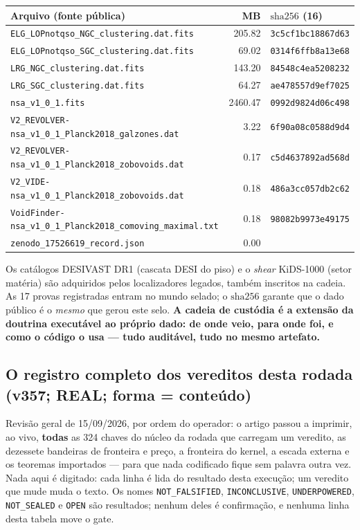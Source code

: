 \documentclass[11pt]{article}
\theoremstyle{definition}\newtheorem{deriv}{Derivação}
\begin{document}
\begin{center}\footnotesize\begin{longtable}{@{}p{}rl@{}}\toprule Arquivo (fonte pública) & MB & $\mathrm{sha}256$ (16) \\ \midrule\endhead \texttt{ELG\_LOPnotqso\_NGC\_clustering.dat.fits} & 205.82 & \texttt{3c5cf1bc18867d63} \\  \texttt{ELG\_LOPnotqso\_SGC\_clustering.dat.fits} & 69.02 & \texttt{0314f6ffb8a13e68} \\  \texttt{LRG\_NGC\_clustering.dat.fits} & 143.20 & \texttt{84548c4ea5208232} \\  \texttt{LRG\_SGC\_clustering.dat.fits} & 64.27 & \texttt{ae478557d9ef7025} \\  \texttt{nsa\_v1\_0\_1.fits} & 2460.47 & \texttt{0992d9824d06c498} \\  \texttt{V2\_REVOLVER-nsa\_v1\_0\_1\_Planck2018\_galzones.dat} & 3.22 & \texttt{6f90a08c0588d9d4} \\  \texttt{V2\_REVOLVER-nsa\_v1\_0\_1\_Planck2018\_zobovoids.dat} & 0.17 & \texttt{c5d4637892ad568d} \\  \texttt{V2\_VIDE-nsa\_v1\_0\_1\_Planck2018\_zobovoids.dat} & 0.18 & \texttt{486a3cc057db2c62} \\  \texttt{VoidFinder-nsa\_v1\_0\_1\_Planck2018\_comoving\_maximal.txt} & 0.18 & \texttt{98082b9973e49175} \\  \texttt{zenodo\_17526619\_record.json} & 0.00 & \texttt{} \\ \bottomrule\end{longtable}\end{center}

Os catálogos DESIVAST DR1 (cascata DESI do piso) e o \emph{shear} KiDS-1000 (setor matéria) são adquiridos pelos localizadores legados, também inscritos na cadeia. As 17 provas registradas entram no mundo selado; o $\mathrm{sha}256$ garante que o dado público é o \emph{mesmo} que gerou este selo. \textbf{A cadeia de custódia é a extensão da doutrina executável ao próprio dado: de onde veio, para onde foi, e como o código o usa --- tudo auditável, tudo no mesmo artefato.}

\subsection*{O registro completo dos vereditos desta rodada (v357; REAL; forma = conteúdo)}

Revisão geral de 15/09/2026, por ordem do operador: o artigo passou a imprimir, ao vivo, \textbf{todas} as 324 chaves do núcleo da rodada que carregam um veredito, as dezessete bandeiras de fronteira e preço, a fronteira do kernel, a escada externa e os teoremas importados --- para que nada codificado fique sem palavra outra vez. Nada aqui é digitado: cada linha é lida do resultado desta execução; um veredito que mude muda o texto. Os nomes \texttt{NOT\_FALSIFIED}, \texttt{INCONCLUSIVE}, \texttt{UNDERPOWERED}, \texttt{NOT\_SEALED} e \texttt{OPEN} são resultados; nenhum deles é confirmação, e nenhuma linha desta tabela move o gate.
\end{document}
